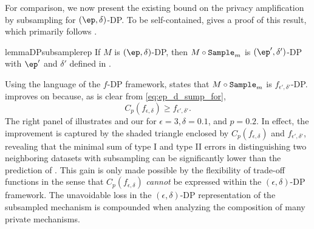 
For comparison, we now present the existing bound on the privacy amplification by subsampling for $(\ep,\delta)$-DP. To be self-contained,  gives a proof of this result, which primarily follows \cite{jon} .

\begin{restatable}{lemma}{DPsubsamplerep}\label{lem:DPsubsample}
If $M$ is $(\ep,\delta)$-DP, then $M\circ\mathtt{Sample}_m$ is $(\ep',\delta')$-DP with $\ep'$ and $\delta'$ defined in .
\end{restatable}

Using the language of the $f$-DP framework,  states that $M\circ\mathtt{Sample}_m$ is $f_{\epsilon',\delta'}$-DP.  improves on  because, as is clear from \eqref{eq:ep_d_sump_for},
\[
C_p(f_{\epsilon, \delta}) \ge f_{\epsilon',\delta'}.
\]
The right panel of  illustrates  and our  for $\epsilon = 3, \delta = 0.1$, and $p = 0.2$. In effect, the improvement is captured by the shaded triangle enclosed by $C_p(f_{\epsilon, \delta})$ and $f_{\epsilon',\delta'}$, revealing that the minimal sum of type I and type II errors in distinguishing two neighboring datasets with subsampling can be significantly lower than the prediction of . This gain is only made possible by the flexibility of trade-off functions in the sense that $C_p(f_{\epsilon, \delta})$ \textit{cannot} be expressed within the $(\epsilon, \delta)$-DP framework. The unavoidable loss in the $(\epsilon,\delta)$-DP representation of the subsampled mechanism is compounded when analyzing the composition of many private mechanisms. 

